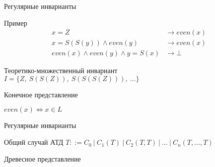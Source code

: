 \documentclass{beamer}
\begin{document}
\begin{frame}{Регулярные инварианты}
\begin{block}{Пример}
\vspace{-1em}
\begin{align*}
x = Z &\to even(x)\\
x = S(S(y)) \wedge even(y) &\to even(x)\\
even(x) \wedge even(y) \wedge y = S(x) &\to \bot    
\end{align*}

\end{block}
\begin{block}{Теоретико-множественный инвариант}
$I = \{Z,\ S(S(Z)),\ S(S(S(Z))),\ \ldots \} $
\end{block}
\begin{block}{Конечное представление}
\begin{minipage}{0.4\linewidth}
    $even(x) \iff x \in L$  
\end{minipage}
\begin{minipage}{0.4\linewidth}
\vspace{1em}
\evenAutomaton
\end{minipage}

\end{block}
\end{frame}



\begin{frame}{Регулярные инварианты}
\begin{block}{Общий случай АТД}
$T ::= C_0\ |\ C_1 (T)\ |\ C_2 (T, T)\ |\ \ldots\ |\ C_n(T,\ldots, T)$
\end{block}
\pause
\begin{block}{Древесное представление}
\begin{center}
   \treeView 
\end{center}

\end{block}
\end{frame}
\end{document}
